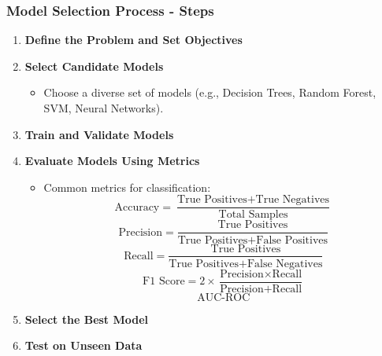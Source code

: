 \documentclass[aspectratio=169]{beamer}
\begin{document}
\begin{frame}[fragile]
    \frametitle{Model Selection Process - Steps}
    \begin{enumerate}
        \item \textbf{Define the Problem and Set Objectives}
        \item \textbf{Select Candidate Models}
            \begin{itemize}
                \item Choose a diverse set of models (e.g., Decision Trees, Random Forest, SVM, Neural Networks).
            \end{itemize}
        \item \textbf{Train and Validate Models}
        \item \textbf{Evaluate Models Using Metrics}
            \begin{itemize}
                \item Common metrics for classification:
                    \begin{equation}
                        \text{Accuracy} = \frac{\text{True Positives} + \text{True Negatives}}{\text{Total Samples}}
                    \end{equation}
                    \begin{equation}
                        \text{Precision} = \frac{\text{True Positives}}{\text{True Positives} + \text{False Positives}}
                    \end{equation}
                    \begin{equation}
                        \text{Recall} = \frac{\text{True Positives}}{\text{True Positives} + \text{False Negatives}}
                    \end{equation}
                    \begin{equation}
                        \text{F1 Score} = 2 \times \frac{\text{Precision} \times \text{Recall}}{\text{Precision} + \text{Recall}}
                    \end{equation}
                    \begin{equation}
                        \text{AUC-ROC}
                    \end{equation}
                \end{itemize}
        \item \textbf{Select the Best Model}
        \item \textbf{Test on Unseen Data}
    \end{enumerate}
\end{frame}
\end{document}
